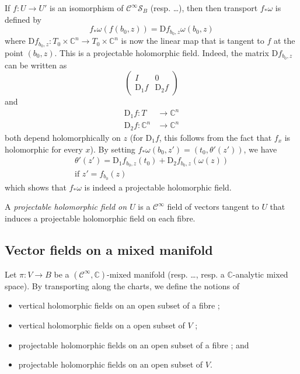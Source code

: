 \documentclass{article}
\newcommand{\CC}{\mathbb{C}}
\newcommand{\DD}{\mathrm{D}}
\begin{document}
If $f\colon U\to U'$ is an isomorphism of $\mathscr{C}^\infty\mathscr{S}_B$ (resp. \ldots), then then transport $f_*\omega$ is defined by
\[
  f_*\omega(f(b_0,z)) = \DD f_{b_0,z}\omega(b_0,z)
\]
where $\DD f_{b_0,z}\colon T_0\times\CC^n\to T_0\times\CC^n$ is now the linear map that is tangent to $f$ at the point $(b_0,z)$.
This is a projectable holomorphic field.
Indeed, the matrix $\DD f_{b_0,z}$ can be written as
\[
  \begin{pmatrix}
    I & 0
  \\\DD_1f & \DD_2f
  \end{pmatrix}
\]
and
\[
  \begin{aligned}
    \DD_1f\colon T &\to \CC^n
  \\\DD_2f\colon \CC^n &\to \CC^n
  \end{aligned}
\]
both depend holomorphically on $z$ (for $\DD_1f$, this follows from the fact that $f_x$ is holomorphic for every $x$).
By setting $f_*\omega(b_0,z')=(t_0,\theta'(z'))$, we have
\[
  \begin{gathered}
    \theta'(z') = \DD_1f_{b_0,z}(t_0) + \DD_2f_{b_0,z}(\omega(z))
  \\\mbox{if $z'=f_{b_0}(z)$}
  \end{gathered}
\]
which shows that $f_*\omega$ is indeed a projectable holomorphic field.

A \emph{projectable holomorphic field on $U$} is a $\mathscr{C}^\infty$ field of vectors tangent to $U$ that induces a projectable holomorphic field on each fibre.


\subsection{Vector fields on a mixed manifold}
\label{III.2}

Let $\pi\colon V\to B$ be a $(\mathscr{C}^\infty,\CC)$-mixed manifold (resp. \ldots, resp. a $\CC$-analytic mixed space).
By transporting along the charts, we define the notions of
\begin{itemize}
  \item vertical holomorphic fields on an open subset of a fibre ;
  \item vertical holomorphic fields on a open subset of $V$ ;
  \item projectable holomorphic fields on an open subset of a fibre ; and
  \item projectable holomorphic fields on an open subset of $V$.
\end{itemize}
\end{document}
